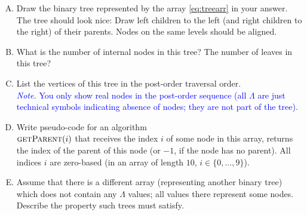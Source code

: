\documentclass[a4paper,12pt]{article}
\begin{document}
\begin{enumerate}[(A)]
\item Draw the binary tree represented by the array \ref{eq:treearr} in your answer. 
The tree should look nice: 
Draw left children to the left (and right children to the right)
of their parents. Nodes on the same levels should be aligned. 
\item What is the number of internal nodes in this tree? The number of leaves in this tree?
\item List the vertices of this tree in the post-order traversal order.\\
\textcolor{blue}{\footnotesize
{\em Note.} You only show real nodes in the post-order sequence (all $\Lambda$ are 
just technical symbols indicating absence of nodes; they are not part of the tree). 
}
\item Write pseudo-code for an algorithm\\ 
$\text{\textsc{getParent}}(i)$ that receives 
the index $i$ of some node in this array, returns the index of the parent of this node (or $-1$, if the node has no parent). 
All indices $i$ are zero-based (in an array of length $10$, $i \in \{0,\ldots,9\}$).
\item Assume that there is a different array (representing another binary tree) which does not contain any $\Lambda$ 
values; all values there represent some nodes. Describe the property such trees must satisfy.  
\end{enumerate}
\end{document}
